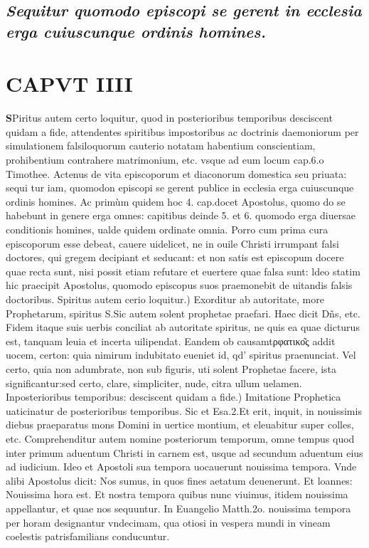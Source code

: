\documentclass{article}
\begin{document}
\begin{pages}
\subsection*{\textit{Sequitur quomodo episcopi se gerent in ecclesia erga cuiuscunque ordinis homines. }}
\endnumbering\beginnumbering\section{CAPVT IIII}\pstart \huge\textbf{S}\normalsize Piritus autem certo loquitur, quod in posterioribus temporibus desciscent quidam a fide, attendentes spiritibus impostoribus ac doctrinis daemoniorum per simulationem falsiloquorum cauterio notatam habentium conscientiam, prohibentium contrahere matrimonium, etc. vsque ad eum locum cap.6.o Timothee. Actenus de vita episcoporum et diaconorum domestica seu priuata: sequi tur iam, quomodon episcopi se gerent publice in ecclesia erga cuiuscunque ordinis homines. Ac primùm quidem hoc 4. cap.docet Apostolus, quomo do se habebunt in genere erga omnes: capitibus deinde 5. et 6. quomodo erga diuersae conditionis homines, ualde quidem ordinate omnia. Porro cum prima cura episcoporum esse debeat, cauere uidelicet, ne in ouile Christi irrumpant falsi doctores, qui gregem decipiant et seducant: et non satis est episcopum docere quae recta sunt, nisi possit etiam refutare et euertere quae falsa sunt: ldeo statim hic praecipit Apostolus, quomodo episcopus suos praemonebit de uitandis falsis doctoribus.  \pend\pstart Spiritus autem cerio loquitur.) Exorditur ab autoritate, more Prophetarum, spiritus S.Sic autem solent prophetae praefari. Haec dicit Dñs, etc. Fidem itaque suis uerbis conciliat ab autoritate spiritus, ne quis ea quae dicturus est, tanquam leuia et incerta uilipendat. Eandem ob causamtρφατικο͂ς addit uocem, certon: quia nimirum indubitato eueniet id, qd' spiritus praenunciat. Vel certo, quia non adumbrate, non sub figuris, uti solent Prophetae facere, ista significantur:sed certo, clare, simpliciter, nude, citra ullum uelamen. Inposterioribus temporibus: desciscent quidam a fide.) Imitatione Prophetica uaticinatur de posterioribus temporibus. Sic et Esa.2.Et erit, inquit, in nouissimis diebus praeparatus mons Domini in uertice montium, et eleuabitur super colles, etc. Comprehenditur autem nomine posteriorum temporum, omne tempus quod inter primum aduentum Christi in carnem est, usque ad secundum aduentum eius ad iudicium. Ideo et Apostoli sua tempora uocauerunt nouissima tempora. Vnde alibi Apostolus dicit: Nos sumus, in quos fines aetatum deuenerunt. Et loannes: Nouissima hora est. Et nostra tempora quibus nunc viuimus, itidem nouissima appellantur, et quae nos sequuntur. In Euangelio Matth.2o. nouissima tempora per horam designantur vndecimam, qua otiosi in vespera mundi in vineam coelestis patrisfamilians conducuntur.  \pend

\end{pages}
\end{document}
